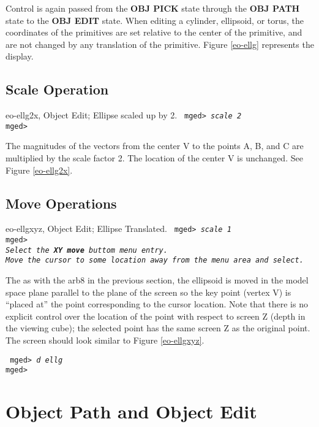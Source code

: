 Control is again passed from the {\bf OBJ PICK} state through the
{\bf OBJ PATH} state to the {\bf OBJ EDIT} state.
When editing a cylinder, ellipsoid, or torus, the coordinates of the
primitives are set relative to the center of the primitive, and are not 
changed by any translation of the primitive.  Figure \ref{eo-ellg}
represents the display.

\subsection{Scale Operation}

\mfig eo-ellg2x, Object Edit; Ellipse scaled up by 2.
\noindent
{\tt
mged> {\em scale 2}\\
mged>\\
}

The magnitudes of the vectors from the center V to the points A, B, and C
are multiplied by the scale factor 2.  The location of the center V is 
unchanged.  See Figure \ref{eo-ellg2x}.

\subsection{Move Operations}

\mfig eo-ellgxyz, Object Edit; Ellipse Translated.
\noindent
{\tt
mged> {\em scale 1}\\
mged>\\
{\em Select the {\bf XY move} buttom menu entry.}\\
{\em Move the cursor to some location away from the menu area and select.}\\
}

The as with the arb8 in the previous section, the ellipsoid is moved
in the model space plane parallel to the plane of the screen so the
key point (vertex V) is ``placed at'' the point corresponding to the
cursor location.  Note that there is no explicit control over the
location of the point with respect to screen Z (depth in the viewing
cube); the selected point has the same screen Z as the original point.
The screen should look similar to Figure \ref{eo-ellgxyz}.

\noindent
{\tt
mged> {\em d ellg}\\
mged>\\
}

\section{Object Path and Object Edit}

